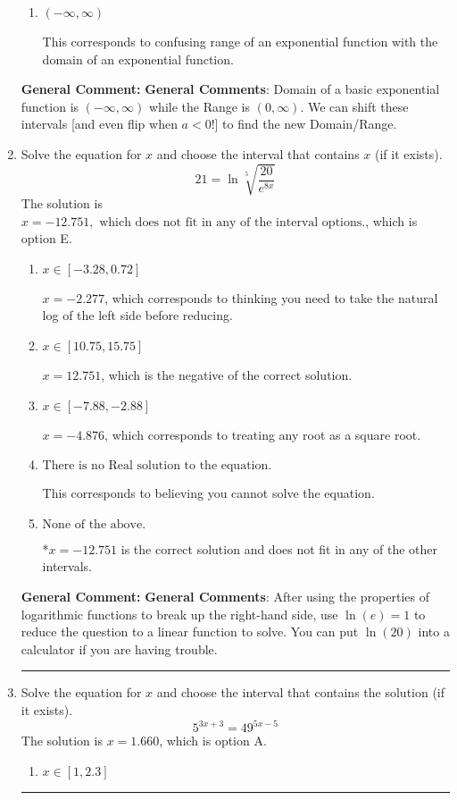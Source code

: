 \documentclass{extbook}[14pt]
\newcommand{\litem}[1]{\item #1

\rule{\textwidth}{0.4pt}}
\begin{document}
\begin{enumerate}
{\begin{enumerate}[label=\Alph*.]
$(-\infty, 1]$, which corresponds to including the endpoint.
\item \( (-\infty, \infty) \)

This corresponds to confusing range of an exponential function with the domain of an exponential function.
\end{enumerate}

\textbf{General Comment:} \textbf{General Comments}: Domain of a basic exponential function is $(-\infty, \infty)$ while the Range is $(0, \infty)$. We can shift these intervals [and even flip when $a<0$!] to find the new Domain/Range.
}
\litem{
 Solve the equation for $x$ and choose the interval that contains $x$ (if it exists).
\[  21 = \ln{\sqrt[5]{\frac{20}{e^{8x}}}} \]The solution is \( x = -12.751, \text{ which does not fit in any of the interval options.} \), which is option E.\begin{enumerate}[label=\Alph*.]
\item \( x \in [-3.28, 0.72] \)

$x = -2.277$, which corresponds to thinking you need to take the natural log of the left side before reducing.
\item \( x \in [10.75, 15.75] \)

$x = 12.751$, which is the negative of the correct solution.
\item \( x \in [-7.88, -2.88] \)

$x = -4.876$, which corresponds to treating any root as a square root.
\item \( \text{There is no Real solution to the equation.} \)

This corresponds to believing you cannot solve the equation.
\item \( \text{None of the above.} \)

*$x = -12.751$ is the correct solution and does not fit in any of the other intervals.
\end{enumerate}

\textbf{General Comment:} \textbf{General Comments}: After using the properties of logarithmic functions to break up the right-hand side, use $\ln(e) = 1$ to reduce the question to a linear function to solve. You can put $\ln(20)$ into a calculator if you are having trouble.
}
\litem{
Solve the equation for $x$ and choose the interval that contains the solution (if it exists).
\[ 5^{3x+3} = 49^{5x-5} \]The solution is \( x = 1.660 \), which is option A.\begin{enumerate}[label=\Alph*.]
\item \( x \in [1, 2.3] \)


\end{enumerate}}
\end{enumerate}
\end{document}
